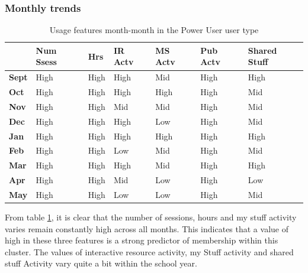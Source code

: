 \documentclass{acm_proc_article-sp}
\begin{document}
\subsubsection{Monthly trends}
\begin{table}
\caption{Usage features month-month in the Power User user type}
\label{cluster1month}
\begin{tabular}{|p{0.6cm}|p{0.6cm}|p{0.6cm}|p{0.6cm}|p{0.6cm}|p{0.8cm}|p{0.8cm}|}
 & Num Ssess & Hrs & IR Actv & MS Actv & Pub Actv & Shared Stuff \\ \hline
\textbf{Sept} & High                                   & High  & High        & Mid             & High           & High                \\ \hline
\textbf{Oct}   & High                                   & High  & High        & High            & High           & Mid                 \\ \hline
\textbf{Nov}  & High                                   & High  & Mid         & Mid             & High           & Mid                 \\ \hline
\textbf{Dec}  & High                                   & High  & High        & Low             & High           & Mid                 \\ \hline
\textbf{Jan}   & High                                   & High  & High        & High            & High           & High                \\ \hline
\textbf{Feb}  & High                                   & High  & Low         & Mid             & High           & Mid                 \\ \hline
\textbf{Mar}     & High                                   & High  & High        & Mid             & High           & High                \\ \hline
\textbf{Apr}     & High                                   & High  & Mid         & Low             & High           & Low                 \\ \hline
\textbf{May}       & High                                   & High  & Low         & Low             & High           & Mid                
\end{tabular}
\end{table}
From table \ref{cluster1month}, it is clear that the number of sessions, hours and my stuff activity varies remain constantly high across all months. This indicates that a value of high in these three features is a strong predictor of membership within this cluster.  The values of interactive resource activity, my Stuff activity and shared stuff Activity vary quite a bit within the school year.
\end{document}
